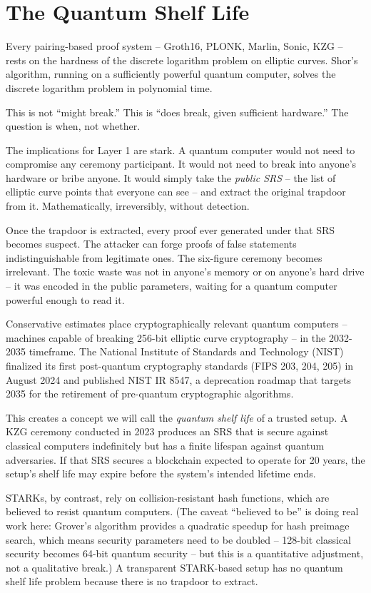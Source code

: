 \documentclass[
  11pt,
  openany]{report}
\begin{document}
\section{The Quantum Shelf Life}\label{the-quantum-shelf-life}

Every pairing-based proof system -- Groth16, PLONK, Marlin, Sonic, KZG -- rests
on the hardness of the discrete logarithm problem on elliptic curves. Shor's
algorithm, running on a sufficiently powerful quantum computer, solves the
discrete logarithm problem in polynomial time.

This is not ``might break.'' This is ``does break, given sufficient hardware.''
The question is when, not whether.

The implications for Layer 1 are stark. A quantum computer would not need to
compromise any ceremony participant. It would not need to break into anyone's
hardware or bribe anyone. It would simply take the \emph{public SRS} -- the list
of elliptic curve points that everyone can see -- and extract the original
trapdoor from it. Mathematically, irreversibly, without detection.

Once the trapdoor is extracted, every proof ever generated under that SRS
becomes suspect. The attacker can forge proofs of false statements
indistinguishable from legitimate ones. The six-figure ceremony becomes
irrelevant. The toxic waste was not in anyone's memory or on anyone's hard drive
-- it was encoded in the public parameters, waiting for a quantum computer
powerful enough to read it.

Conservative estimates place cryptographically relevant quantum computers --
machines capable of breaking 256-bit elliptic curve cryptography -- in the
2032-2035 timeframe. The National Institute of Standards and Technology (NIST)
finalized its first post-quantum cryptography standards (FIPS 203, 204, 205) in
August 2024 and published NIST IR 8547, a deprecation roadmap that targets 2035
for the retirement of pre-quantum cryptographic algorithms.

This creates a concept we will call the \emph{quantum shelf life} of a trusted
setup. A KZG ceremony conducted in 2023 produces an SRS that is secure against
classical computers indefinitely but has a finite lifespan against quantum
adversaries. If that SRS secures a blockchain expected to operate for 20 years,
the setup's shelf life may expire before the system's intended lifetime ends.

STARKs, by contrast, rely on collision-resistant hash functions, which are
believed to resist quantum computers. (The caveat ``believed to be'' is doing
real work here: Grover's algorithm provides a quadratic speedup for hash
preimage search, which means security parameters need to be doubled -- 128-bit
classical security becomes 64-bit quantum security -- but this is a quantitative
adjustment, not a qualitative break.) A transparent STARK-based setup has no
quantum shelf life problem because there is no trapdoor to extract.
\end{document}
